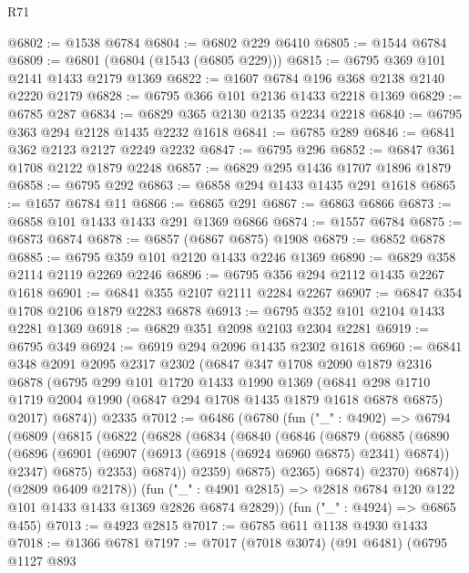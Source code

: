 \begin{lexlean}{R71}
\begin{coremodule}
@6802 := @1538 @6784
@6804 := @6802 @229 @6410
@6805 := @1544 @6784
@6809 := @6801 (@6804 (@1543 (@6805 @229)))
@6815 := @6795 @369 @101 @2141 @1433 @2179 @1369
@6822 := @1607 @6784 @196 @368 @2138 @2140 @2220 @2179
@6828 := @6795 @366 @101 @2136 @1433 @2218 @1369
@6829 := @6785 @287
@6834 := @6829 @365 @2130 @2135 @2234 @2218
@6840 := @6795 @363 @294 @2128 @1435 @2232 @1618
@6841 := @6785 @289
@6846 := @6841 @362 @2123 @2127 @2249 @2232
@6847 := @6795 @296
@6852 := @6847 @361 @1708 @2122 @1879 @2248
@6857 := @6829 @295 @1436 @1707 @1896 @1879
@6858 := @6795 @292
@6863 := @6858 @294 @1433 @1435 @291 @1618
@6865 := @1657 @6784 @11
@6866 := @6865 @291
@6867 := @6863 @6866
@6873 := @6858 @101 @1433 @1433 @291 @1369 @6866
@6874 := @1557 @6784
@6875 := @6873 @6874
@6878 := @6857 (@6867 @6875) @1908
@6879 := @6852 @6878
@6885 := @6795 @359 @101 @2120 @1433 @2246 @1369
@6890 := @6829 @358 @2114 @2119 @2269 @2246
@6896 := @6795 @356 @294 @2112 @1435 @2267 @1618
@6901 := @6841 @355 @2107 @2111 @2284 @2267
@6907 := @6847 @354 @1708 @2106 @1879 @2283 @6878
@6913 := @6795 @352 @101 @2104 @1433 @2281 @1369
@6918 := @6829 @351 @2098 @2103 @2304 @2281
@6919 := @6795 @349
@6924 := @6919 @294 @2096 @1435 @2302 @1618
@6960 := @6841
    @348
    @2091
    @2095
    @2317
    @2302
    (@6847
      @347
      @1708
      @2090
      @1879
      @2316
      @6878
      (@6795
        @299
        @101
        @1720
        @1433
        @1990
        @1369
        (@6841 @298 @1710 @1719 @2004 @1990 (@6847 @294 @1708 @1435 @1879 @1618 @6878 @6875) @2017)
        @6874))
    @2335
@7012 := @6486
    (@6780
      (fun ("_" : @4902) =>
      @6794
        (@6809
          (@6815
            (@6822
              (@6828
                (@6834
                  (@6840
                    (@6846
                      (@6879
                        (@6885
                          (@6890
                            (@6896
                              (@6901 (@6907 (@6913 (@6918 (@6924 @6960 @6875) @2341) @6874)) @2347)
                              @6875)
                            @2353)
                          @6874))
                      @2359)
                    @6875)
                  @2365)
                @6874)
              @2370)
            @6874))
        (@2809 @6409 @2178))
      (fun ("_" : @4901 @2815) => @2818 @6784 @120 @122 @101 @1433 @1433 @1369 @2826 @6874 @2829))
    (fun ("_" : @4924) => @6865 @455)
@7013 := @4923 @2815
@7017 := @6785 @611 @1138 @4930 @1433
@7018 := @1366 @6781
@7197 := @7017
    (@7018 @3074)
    (@91 @6481)
    (@6795
      @1127
      @893

\end{coremodule}
\end{lexlean}
